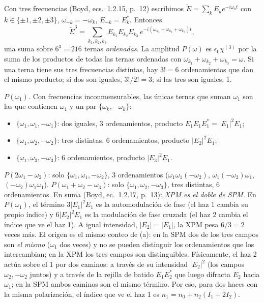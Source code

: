  Con tres frecuencias (Boyd, ecs.~1.2.15, p.~12) escribimos $\tilde E=\sum_kE_ke^{-i\omega_kt}$ con $k\in\{\pm1,\pm2,\pm3\}$, $\omega_{-k}=-\omega_k$, $E_{-k}=E_k^*$. Entonces
\[
\tilde E^3=\sum_{k_1,k_2,k_3}E_{k_1}E_{k_2}E_{k_3}\,e^{-i(\omega_{k_1}+\omega_{k_2}+\omega_{k_3})t},
\]
una suma sobre $6^3=216$ ternas \emph{ordenadas}. La amplitud $P(\omega)$ es $\epsilon_0\chi^{(3)}$ por la suma de los productos de todas las ternas ordenadas con $\omega_{k_1}+\omega_{k_2}+\omega_{k_3}=\omega$. Si una terna tiene sus tres frecuencias distintas, hay $3!=6$ ordenamientos que dan el mismo producto; si dos son iguales, $3!/2!=3$; si las tres son iguales, 1.

\emph{$P(\omega_1)$.} Con frecuencias inconmensurables, las únicas ternas que suman $\omega_1$ son las que contienen $\omega_1$ y un par $\{\omega_k,-\omega_k\}$:
\begin{itemize}
\item $\{\omega_1,\omega_1,-\omega_1\}$: dos iguales, 3 ordenamientos, producto $E_1E_1E_1^*=|E_1|^2E_1$;
\item $\{\omega_1,\omega_2,-\omega_2\}$: tres distintas, 6 ordenamientos, producto $|E_2|^2E_1$;
\item $\{\omega_1,\omega_3,-\omega_3\}$: 6 ordenamientos, producto $|E_3|^2E_1$.
\end{itemize}
\emph{$P(2\omega_1-\omega_2)$}: solo $\{\omega_1,\omega_1,-\omega_2\}$, 3 ordenamientos ($\omega_1\omega_1(-\omega_2)$, $\omega_1(-\omega_2)\omega_1$, $(-\omega_2)\omega_1\omega_1$).
\emph{$P(\omega_1+\omega_2-\omega_3)$}: solo $\{\omega_1,\omega_2,-\omega_3\}$, tres distintas, 6 ordenamientos. En suma (Boyd, ec.~1.2.17, p.~13):
\emph{XPM es el doble de SPM.} En $P(\omega_1)$, el término $3|E_1|^2E_1$ es la automodulación de fase (el haz 1 cambia su propio índice) y $6|E_2|^2E_1$ es la modulación de fase cruzada (el haz 2 cambia el índice que ve el haz 1). A igual intensidad, $|E_2|=|E_1|$, la XPM pesa $6/3=2$ veces más. El origen es el mismo conteo de (a): en la SPM dos de los tres campos son \emph{el mismo} ($\omega_1$ dos veces) y no se pueden distinguir los ordenamientos que los intercambian; en la XPM los tres campos son distinguibles. Físicamente, el haz 2 actúa sobre el 1 por dos caminos: a través de su intensidad $|E_2|^2$ (los campos $\omega_2,-\omega_2$ juntos) y a través de la rejilla de batido $E_1E_2^*$ que luego difracta $E_2$ hacia $\omega_1$; en la SPM ambos caminos son el mismo término. Por eso, para dos haces con la misma polarización, el índice que ve el haz 1 es $n_1=n_0+n_2(I_1+2I_2)$.

